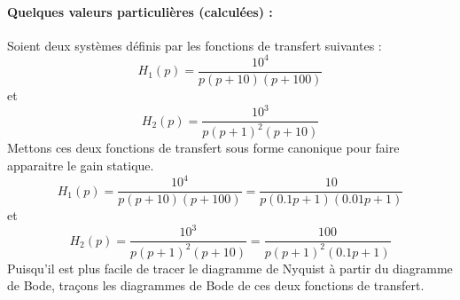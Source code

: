 \paragraph{Quelques valeurs particulières (calculées) :}
\begin{center}
\end{center}
\clearpage
Soient deux systèmes définis par les fonctions de transfert suivantes :
\[
H_1(p) =\dfrac{10^4}{p(p+10)(p+100)}
\]
et
\[
H_2(p) =\dfrac{10^3}{p(p+1)^2(p+10)}
\]
Mettons ces deux fonctions de transfert sous forme canonique pour faire 
apparaitre le gain statique.
\[
H_1(p) =\dfrac{10^4}{p(p+10)(p+100)} = \dfrac{10}{p(0.1p+1)(0.01p+1)}
\]
et
\[
H_2(p) =\dfrac{10^3}{p(p+1)^2(p+10)}= \dfrac{100}{p(p+1)^2(0.1p+1)}
\]
Puisqu'il est plus facile de tracer le diagramme de Nyquist à partir 
du diagramme de Bode, traçons les diagrammes de Bode de ces deux 
fonctions de transfert.
